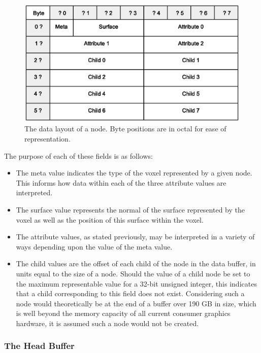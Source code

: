 \documentclass[onecolumn, draftclsnofoot,10pt, compsoc]{IEEEtran}
\begin{document}
\begin{figure}[H]
\begin{center}
\includegraphics[width=\textwidth, viewport=50 120 475 380, clip=true]{images/nodeLayout.eps}
\caption{The data layout of a node. Byte positions are in octal for ease of representation.}
\end{center}
\end{figure}

The purpose of each of these fields is as follows:

\begin{itemize}

\item The meta value indicates the type of the voxel represented by a given node. This informs how data within each of the three attribute values are interpreted.
\item The surface value represents the normal of the surface represented by the voxel as well as the position of this surface within the voxel.
\item The attribute values, as stated previously, may be interpreted in a variety of ways depending upon the value of the meta value.
\item The child values are the offset of each child of the node in the data buffer, in units equal to the size of a node. Should the value of a child node be set to the maximum representable value for a 32-bit unsigned integer, this indicates that a child corresponding to this field does not exist. Considering such a node would theoretically be at the end of a buffer over 190 GB in size, which is well beyond the memory capacity of all current consumer graphics hardware, it is assumed such a node would not be created.
\end{itemize}


\subsubsection{The Head Buffer}
\end{document}

